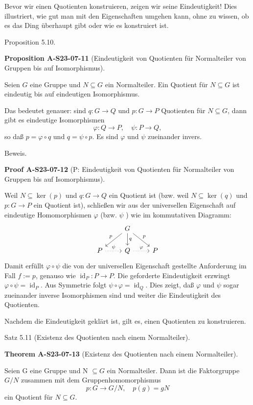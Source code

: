 \documentclass[10pt, letterpaper]{article}
\newcommand{\CustomHeading}[3]{%
  \par\medskip\noindent%
  \textbf{#1 #2} \textnormal{(#3)}.\enskip%
}
\newenvironment{PROP}[2]{\begin{unitbox}\CustomHeading{Proposition}{#1}{#2}}{\end{unitbox}}
\newenvironment{THEO}[2]{\begin{unitbox}\CustomHeading{Theorem}{#1}{#2}}{\end{unitbox}}
\newenvironment{PROOF}[2]{\begin{unitbox}\CustomHeading{Proof}{#1}{#2}}{\end{unitbox}}
\begin{document}
Bevor wir einen Quotienten konstruieren, zeigen wir seine Eindeutigkeit! Dies illustriert, wie gut man mit den Eigenschaften umgehen kann, ohne zu wissen, ob es das Ding überhaupt gibt oder wie es konstruiert ist.

Proposition 5.10. 

\begin{PROP}{A-S23-07-11}{Eindeutigkeit von Quotienten für Normalteiler von Gruppen bis auf Isomorphismus}
Seien $G$ eine Gruppe und $N \subseteq G$ ein Normalteiler. Ein Quotient für $N \subseteq G$ ist eindeutig bis auf eindeutigen Isomorphismus.

Das bedeutet genauer: sind $q: G \rightarrow Q$ und $p: G \rightarrow P$ Quotienten für $N \subseteq G$, dann gibt es eindeutige Isomorphismen
$$
\varphi: Q \rightarrow P, \quad \psi: P \rightarrow Q,
$$
so daß $p=\varphi \circ q$ und $q=\psi \circ p$. Es sind $\varphi$ und $\psi$ zueinander invers.
\end{PROP}


Beweis. 

\begin{PROOF}{A-S23-07-12}{P: Eindeutigkeit von Quotienten für Normalteiler von Gruppen bis auf Isomorphismus}
Weil $N \subseteq \operatorname{ker}(p)$ und $q: G \rightarrow Q$ ein Quotient ist (bzw. weil $N \subseteq \operatorname{ker}(q)$ und $p: G \rightarrow P$ ein Quotient ist), schließen wir aus der universellen Eigenschaft auf eindeutige Homomorphismen $\varphi$ (bzw. $\psi$ ) wie im kommutativen Diagramm:
\[
\begin{tikzcd}
& G \arrow[dl, "p"'] \arrow[d, "q"] \arrow[dr, "p"] & \\
P \arrow[r, dotted, "\psi"] & Q \arrow[r, dotted, "\varphi"] & P
\end{tikzcd}
\]
Damit erfüllt $\varphi \circ \psi$ die von der universellen Eigenschaft gestellte Anforderung im Fall $f:=p$, genauso wie $\operatorname{id}_{P}: P \rightarrow P$. Die geforderte Eindeutigkeit erzwingt $\varphi \circ \psi=\operatorname{id}_{P}$. Aus Symmetrie folgt $\psi \circ \varphi=\operatorname{id}_{Q}$. Dies zeigt, daß $\varphi$ und $\psi$ sogar zueinander inverse Isomorphismen sind und weiter die Eindeutigkeit des Quotienten.
\end{PROOF}

Nachdem die Eindeutigkeit geklärt ist, gilt es, einen Quotienten zu konstruieren.


Satz 5.11 (Existenz des Quotienten nach einem Normalteiler). 

\begin{THEO}{A-S23-07-13}{Existenz des Quotienten nach einem Normalteiler}
Seien G eine Gruppe und N $\subseteq G$ ein Normalteiler. Dann ist die Faktorgruppe $G / N$ zusammen mit dem Gruppenhomomorphismus
$$
p: G \rightarrow G / N, \quad p(g)=g N
$$
ein Quotient für $N \subseteq G$.
\end{THEO}
\end{document}
